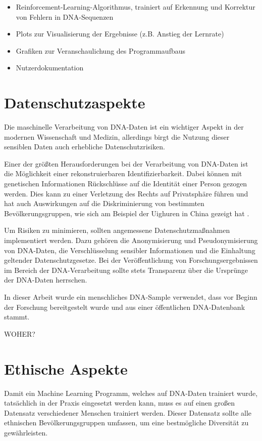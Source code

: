 \documentclass[oneside,bibliography=totocnumbered,BCOR=5mm]{scrbook}%
\theoremstyle{definition}
\theoremstyle{definition}
\theoremstyle{definition}
\theoremstyle{definition}
\theoremstyle{definition}
\theoremstyle{definition}
\begin{document}
\begin{itemize}
  \item Reinforcement-Learning-Algorithmus, trainiert auf Erkennung und Korrektur von Fehlern in DNA-Sequenzen
  \item Plots zur Visualisierung der Ergebnisse (z.B. Anstieg der Lernrate)
  \item Grafiken zur Veranschaulichung des Programmaufbaus
  \item Nutzerdokumentation
\end{itemize}

\section{Datenschutzaspekte}
Die maschinelle Verarbeitung von DNA-Daten ist ein wichtiger Aspekt in der 
modernen Wissenschaft und Medizin, allerdings birgt die Nutzung dieser 
sensiblen Daten auch erhebliche Datenschutzrisiken.

Einer der größten Herausforderungen bei der Verarbeitung von DNA-Daten ist die Möglichkeit 
einer rekonstruierbaren Identifizierbarkeit. Dabei können mit genetischen Informationen 
Rückschlüsse auf die Identität einer Person gezogen werden. Dies kann zu einer Verletzung des Rechts 
auf Privatsphäre führen und hat auch Auswirkungen auf die Diskriminierung 
von bestimmten Bevölkerungsgruppen, wie sich am Beispiel der Uighuren in China gezeigt hat \autocite{chinaDNAprivacy}.

Um Risiken zu minimieren, sollten angemessene Datenschutzmaßnahmen implementiert werden. 
Dazu gehören die Anonymisierung und Pseudonymisierung von DNA-Daten, die Verschlüsselung sensibler Informationen 
und die Einhaltung geltender Datenschutzgesetze. 
Bei der Veröffentlichung von Forschungsergebnissen im Bereich der DNA-Verarbeitung sollte stets
Transparenz über die Ursprünge der DNA-Daten herrschen.

In dieser Arbeit wurde ein menschliches DNA-Sample verwendet, dass vor Beginn der Forschung bereitgestelt wurde und
aus einer öffentlichen DNA-Datenbank stammt.


WOHER?


\section{Ethische Aspekte}
Damit ein Machine Learning Programm, welches auf DNA-Daten trainiert wurde, tatsächlich in der Praxis
eingesetzt werden kann, muss es auf einen großen Datensatz verschiedener Menschen trainiert werden.
Dieser Datensatz sollte alle ethnischen Bevölkerungsgruppen umfassen, um eine bestmögliche Diversität
zu gewährleisten. 
\end{document}

